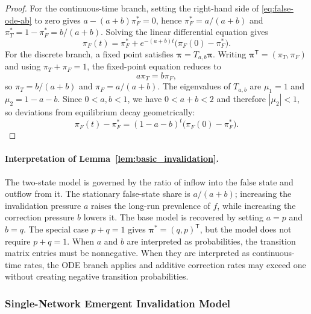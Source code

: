 \documentclass[12pt]{article}
\theoremstyle{definition}
\begin{document}
\begin{proof}
For the continuous-time branch, setting the right-hand side of
\eqref{eq:false-ode-ab} to zero gives
$a-(a+b)\pi_F^*=0$, hence $\pi_F^*=a/(a+b)$ and
$\pi_T^*=1-\pi_F^*=b/(a+b)$.  Solving the linear differential equation gives
\[
    \pi_F(t)=\pi_F^*+e^{-(a+b)t}\bigl(\pi_F(0)-\pi_F^*\bigr).
\]
For the discrete branch, a fixed point satisfies
$\boldsymbol{\pi}=T_{a,b}\boldsymbol{\pi}$.  Writing
$\boldsymbol{\pi}^{\mathsf T}=(\pi_T,\pi_F)$ and using
$\pi_T+\pi_F=1$, the fixed-point equation reduces to
\[
    a\pi_T=b\pi_F,
\]
so $\pi_T=b/(a+b)$ and $\pi_F=a/(a+b)$.  The eigenvalues of $T_{a,b}$ are
$\mu_1=1$ and $\mu_2=1-a-b$.  Since $0<a,b<1$, we have
$0<a+b<2$ and therefore $|\mu_2|<1$, so deviations from equilibrium decay
geometrically:
\[
    \pi_F(t)-\pi_F^*=(1-a-b)^t\bigl(\pi_F(0)-\pi_F^*\bigr).
\]
\end{proof}

\paragraph{Interpretation of Lemma~\ref{lem:basic_invalidation}.}
The two-state model is governed by the ratio of inflow into the false state and
outflow from it.  The stationary false-state share is $a/(a+b)$; increasing the
invalidation pressure $a$ raises the long-run prevalence of $f$, while
increasing the correction pressure $b$ lowers it.  The base model is recovered
by setting $a=p$ and $b=q$.  The special case $p+q=1$ gives
$\boldsymbol{\pi}^{*}=(q,p)^{\mathsf T}$, but the model does not require
$p+q=1$.  When $a$ and $b$ are interpreted as probabilities, the transition
matrix entries must be nonnegative.  When they are interpreted as continuous-time
rates, the ODE branch applies and additive correction rates may exceed one
without creating negative transition probabilities.


\subsubsection{Single-Network Emergent Invalidation Model}
\label{sec:single-network-emergent}
\end{document}
